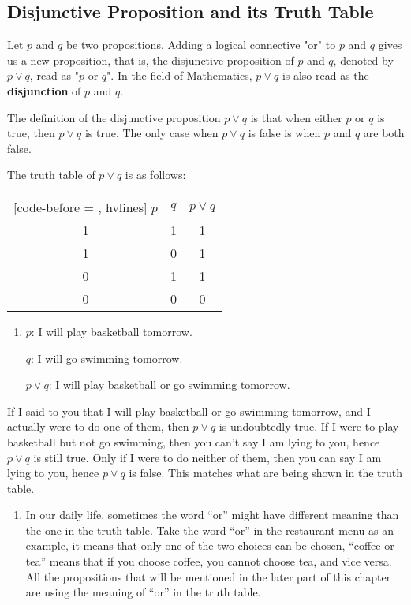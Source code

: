 \documentclass{report}
\newcounter{example}
\begin{document}
\subsection*{Disjunctive Proposition and its Truth Table}

Let $p$ and $q$ be two propositions. Adding a logical connective "or" to $p$
and $q$ gives us a new proposition, that is, the disjunctive proposition of $p$
and $q$, denoted by $p \lor q$, read as "$p$ or $q$". In the field of
Mathematics, $p \lor q$ is also read as the \textbf{disjunction} of $p$ and
$q$.

The definition of the disjunctive proposition $p \lor q$ is that when either
$p$ or $q$ is true, then $p \lor q$ is true. The only case when $p \lor q$ is
false is when $p$ and $q$ are both false.

The truth table of $p \lor q$ is as follows:
\begin{center}
    \begin{NiceTabular}{|c|c|c|}[code-before = , hvlines]
        $p$ & $q$ & $p \lor q$ \\
        1   & 1   & 1          \\
        1   & 0   & 1          \\
        0   & 1   & 1          \\
        0   & 0   & 0          \\
    \end{NiceTabular}
\end{center}
\begin{enumerate}[label=\indent For example, leftmargin=*]
    \item $p$: I will play basketball tomorrow.

          $q$: I will go swimming tomorrow.

          $p \lor q$: I will play basketball or go swimming tomorrow.
\end{enumerate}

If I said to you that I will play basketball or go swimming tomorrow, and I
actually were to do one of them, then $p \lor q$ is undoubtedly true. If I were
to play basketball but not go swimming, then you can't say I am lying to you,
hence $p \lor q$ is still true. Only if I were to do neither of them, then you
can say I am lying to you, hence $p \lor q$ is false. This matches what are
being shown in the truth table.
\begin{enumerate}[label=\textbf{NOTE: }, leftmargin=*]
    \item In our daily life, sometimes the word ``or'' might have different meaning than
          the one in the truth table. Take the word ``or'' in the restaurant menu as an
          example, it means that only one of the two choices can be chosen, ``coffee or
          tea'' means that if you choose coffee, you cannot choose tea, and vice versa.
          All the propositions that will be mentioned in the later part of this chapter
          are using the meaning of ``or'' in the truth table.
\end{enumerate}
\end{document}
